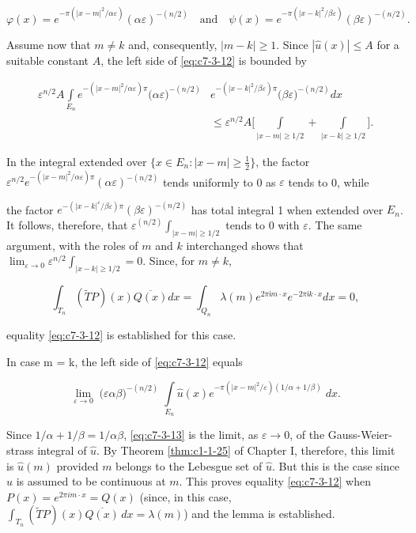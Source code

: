 \[
\varphi(x)=e^{-\pi(|x-m|^{2}/\alpha\varepsilon)}(\alpha\varepsilon)^{-(n/2)}\quad\text{and}\quad\psi(x)=e^{-\pi(|x-k|^{2}/\beta\varepsilon)}(\beta\varepsilon)^{-(n/2)}.
\]

Assume now that $m \neq k$ and, consequently, $|m - k| \geq 1$. Since $|\hat{u}(x)| \leq A$ for a suitable constant $A$, the left side of \eqref{eq:c7-3-12} is bounded by

\[
\begin{aligned}\varepsilon^{n/2}A\int\limits_{E_{n}}e^{-(|x-m|^{2}/\alpha\varepsilon)\pi}\big(\alpha\varepsilon\big)^{-(n/2)}&e^{-(|x-k|^{2}/\beta\varepsilon)\pi}\big(\beta\varepsilon\big)^{-(n/2)}dx\\\ &\leq\varepsilon^{n/2}A\Bigg[\int\limits_{|x-m|\geq1/2}+\int\limits_{|x-k|\geq1/2}\Bigg].\end{aligned}
\]

In the integral extended over $\{x \in E_n: |x - m| \geq \frac{1}{2}\}$, the factor $\varepsilon^{n/2} e^{-(|x - m|^2/\alpha\varepsilon)\pi}(\alpha\varepsilon)^{-(n/2)}$ tends uniformly to 0 as $\varepsilon$ tends to 0, while

the factor $e^{-(|x-k|^{\varepsilon}/\beta\varepsilon)\pi}(\beta\varepsilon)^{-(n/2)}$ has total integral 1 when extended over $E_n$. It follows, therefore, that $\varepsilon^{(n/2)}\int_{|x-m|\geq1/2}$ tends to 0 with $\varepsilon$. The same argument, with the roles of $m$ and $k$ interchanged shows that $\lim_{\varepsilon\to0}\varepsilon^{n/2}\int_{|x-k|\geq1/2}=0$. Since, for $m\neq k$,

\[
\int_{T_{n}}(\widetilde{T}P)(x)\overline{{Q(x)}}d x=\int_{Q_{n}}\lambda(m)e^{2\pi\mathsf{i}m\cdot x}e^{-2\pi\mathsf{i}k\cdot x}d x=0,
\]

equality \eqref{eq:c7-3-12} is established for this case.

In case m = k, the left side of \eqref{eq:c7-3-12} equals

\begin{equation}\label{eq:c7-3-13}
\lim_{\varepsilon\to0}\;\big(\varepsilon\alpha\beta\big)^{-(n/2)}\;\int\limits_{E_{n}}\hat{u}(x)e^{-\pi(|x-m|^{2}/\varepsilon)(1/\alpha+1/\beta)}\;d x.
\end{equation}

Since $1/\alpha + 1/\beta = 1/\alpha\beta$, \eqref{eq:c7-3-13} is the limit, as $\varepsilon \to 0$, of the Gauss-Weier-strass integral of $\hat{u}$. By Theorem \ref{thm:c1-1-25} of Chapter I, therefore, this limit is $\hat{u}(m)$ provided $m$ belongs to the Lebesgue set of $\hat{u}$. But this is the case since $\hat{u}$ is assumed to be continuous at $m$. This proves equality \eqref{eq:c7-3-12} when $P(x) = e^{2\pi im \cdot x} = Q(x)$ (since, in this case, $\int_{T_n}(\tilde{T}P)(x)\overline{Q(x)} \, dx = \lambda(m)$) and the lemma is established.

